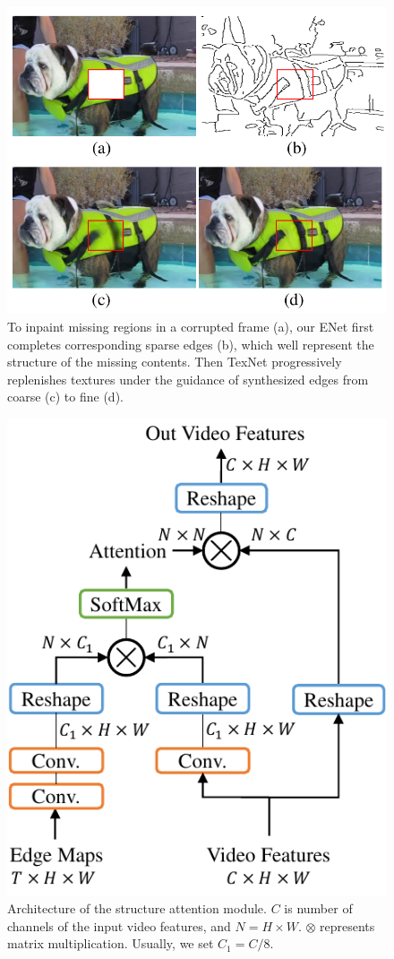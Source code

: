 \begin{figure}[t]
	\centering
	\includegraphics[width=0.8\columnwidth]{coars-fine} 
	\caption{To inpaint missing regions in a corrupted frame (a), our ENet first completes corresponding sparse edges (b), which well represent the structure of the missing contents. Then TexNet progressively replenishes textures under the guidance of synthesized edges from coarse (c) to fine (d).}
	
	\label{fig:coarse-fine}
\end{figure}




\begin{figure}[t]
	\centering
	\includegraphics[width=0.65\columnwidth]{SAM}
	\caption{Architecture of the structure attention module. $C$ is number of channels of the input video features, and $N=H\times W$. $\otimes$ represents matrix multiplication. Usually, we set $C_1=C/8$.}
	\label{SEM}
\end{figure} 





